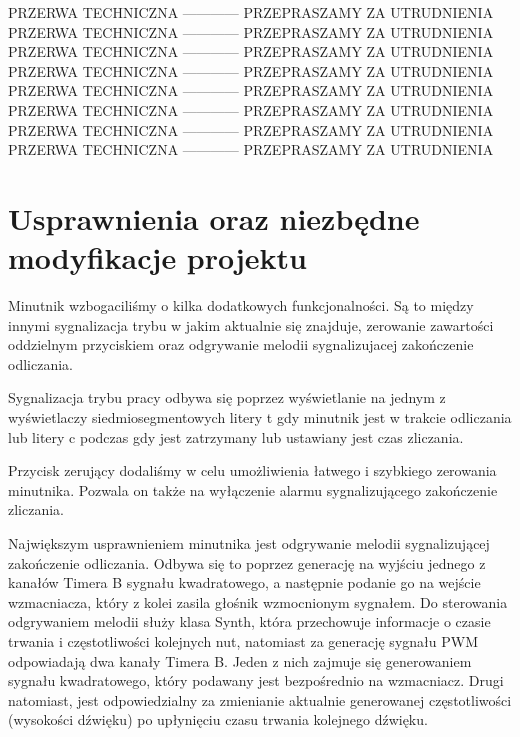 \documentclass[fleqn]{article}
\begin{document}
                                  PRZERWA TECHNICZNA  ------------  PRZEPRASZAMY ZA UTRUDNIENIA
                                  PRZERWA TECHNICZNA  ------------  PRZEPRASZAMY ZA UTRUDNIENIA
                                  PRZERWA TECHNICZNA  ------------  PRZEPRASZAMY ZA UTRUDNIENIA
                                  PRZERWA TECHNICZNA  ------------  PRZEPRASZAMY ZA UTRUDNIENIA
                                  PRZERWA TECHNICZNA  ------------  PRZEPRASZAMY ZA UTRUDNIENIA
                                  PRZERWA TECHNICZNA  ------------  PRZEPRASZAMY ZA UTRUDNIENIA
                                  PRZERWA TECHNICZNA  ------------  PRZEPRASZAMY ZA UTRUDNIENIA
                                  PRZERWA TECHNICZNA  ------------  PRZEPRASZAMY ZA UTRUDNIENIA





















\section{Usprawnienia oraz niezbędne modyfikacje projektu}

Minutnik wzbogaciliśmy o kilka dodatkowych funkcjonalności. Są to między innymi sygnalizacja trybu w jakim aktualnie się znajduje, zerowanie zawartości oddzielnym przyciskiem oraz odgrywanie melodii sygnalizujacej zakończenie odliczania.

Sygnalizacja trybu pracy odbywa się poprzez wyświetlanie na jednym z wyświetlaczy siedmiosegmentowych litery t gdy minutnik jest w trakcie odliczania lub litery c podczas gdy jest zatrzymany lub ustawiany jest czas zliczania.

Przycisk zerujący dodaliśmy w celu umożliwienia łatwego i szybkiego zerowania minutnika. Pozwala on także na wyłączenie alarmu sygnalizującego zakończenie zliczania.

Największym usprawnieniem minutnika jest odgrywanie melodii sygnalizującej zakończenie odliczania. Odbywa się to poprzez generację na wyjściu jednego z kanałów Timera B sygnału kwadratowego, a następnie podanie go na wejście wzmacniacza, który z kolei zasila głośnik wzmocnionym sygnałem. Do sterowania odgrywaniem melodii służy klasa Synth, która przechowuje informacje o czasie trwania i częstotliwości kolejnych nut, natomiast za generację sygnału PWM odpowiadają dwa kanały Timera B. Jeden z nich zajmuje się generowaniem sygnału kwadratowego, który podawany jest bezpośrednio na wzmacniacz. Drugi natomiast, jest odpowiedzialny za zmienianie aktualnie generowanej częstotliwości (wysokości dźwięku) po upłynięciu czasu trwania kolejnego dźwięku.
\end{document}
